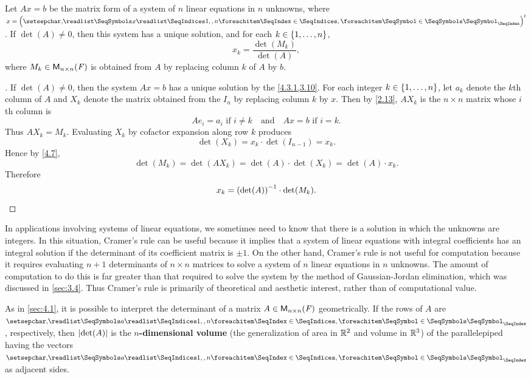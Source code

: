 \begin{thm}\label{4.9}
  Let \(Ax = b\) be the matrix form of a system of \(n\) linear equations in \(n\) unknowns, where \(x = \tp{\tuple{x}{1,,n}}\).
  If \(\det(A) \neq 0\), then this system has a unique solution, and for each \(k \in \left\lbrace1, \dots, n\right\rbrace\),
  \[
    x_k = \frac{\det(M_k)}{\det(A)},
  \]
  where \(M_k \in \mathsf{M}_{{n} \times n}({\mathit{F}})\) is obtained from \(A\) by replacing column \(k\) of \(A\) by \(b\).
\end{thm}

\begin{proof}[]
  If \(\det(A) \neq 0\), then the system \(Ax = b\) has a unique solution by the \cref{4.3.1,3.10}.
  For each integer \(k \in \left\lbrace1, \dots, n\right\rbrace\), let \(a_k\) denote the \(k\)th column of \(A\) and \(X_k\) denote the matrix obtained from the \(I_n\) by replacing column \(k\) by \(x\).
  Then by \cref{2.13}, \(A X_k\) is the \(n \times n\) matrix whose \(i\)th column is
  \[
    A e_i = a_i \text{ if } i \neq k \quad \text{and} \quad Ax = b \text{ if } i = k.
  \]
  Thus \(A X_k = M_k\).
  Evaluating \(X_k\) by cofactor expansion along row \(k\) produces
  \[
    \det(X_k) = x_k \cdot \det(I_{n - 1}) = x_k.
  \]
  Hence by \cref{4.7},
  \[
    \det(M_k) = \det(A X_k) = \det(A) \cdot \det(X_k) = \det(A) \cdot x_k.
  \]
  Therefore
  \[
    x_k = \left\lparen\det(A)\right\rparen^{-1} \cdot \det(M_k).
  \]
\end{proof}

\begin{note}
  In applications involving systems of linear equations, we sometimes need to know that there is a solution in which the unknowns are integers.
  In this situation, Cramer's rule can be useful because it implies that a system of linear equations with integral coefficients has an integral solution if the determinant of its coefficient matrix is \(\pm 1\).
  On the other hand, Cramer's rule is not useful for computation because it requires evaluating \(n + 1\) determinants of \(n \times n\) matrices to solve a system of \(n\) linear equations in \(n\) unknowns.
  The amount of computation to do this is far greater than that required to solve the system by the method of Gaussian-Jordan elimination, which was discussed in \cref{sec:3.4}.
  Thus Cramer's rule is primarily of theoretical and aesthetic interest, rather than of computational value.
\end{note}

\begin{note}
  As in \cref{sec:4.1}, it is possible to interpret the determinant of a matrix \(A \in \mathsf{M}_{{n} \times n}({\mathit{F}})\) geometrically.
  If the rows of \(A\) are \(\seq{a}{1,,n}\), respectively, then \(\left\lvert\det(A)\right\rvert\) is the \textbf{\(n\)-dimensional volume} (the generalization of area in \(\mathbb{R}^2\) and volume in \(\mathbb{R}^3\)) of the parallelepiped having the vectors \(\seq{a}{1,,n}\) as adjacent sides.
\end{note}

